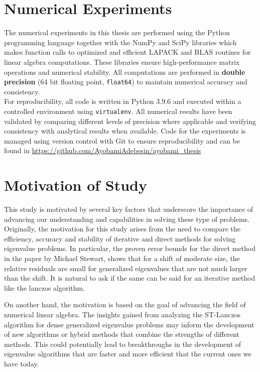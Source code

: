 \documentclass[12pt,gsu,online,openany,singleside,hidelinks]{gsudiss}
\newcommand{\comm}[1]{\added[comment={#1}]{}}
\begin{document}
\section{Numerical Experiments}

\comm{This material would be better if it were at the beginning of the section where you give results of experiments.}
The numerical experiments in this thesis are performed using the Python programming language together with the NumPy and SciPy libraries which makes function calls to optimized and efficient LAPACK and BLAS routines for linear algebra computations. These libraries ensure high-performance matrix operations and numerical stability. All computations are performed in \textbf{double precision} (64 bit floating point, \texttt{float64}) to maintain numerical accuracy and consistency.\\
For reproducibility, all code is written in Python $3.9.6$ and executed within a controlled environment using \texttt{virtualenv}. All numerical results have been validated by comparing different levels of precision where applicable and verifying consistency with analytical results when available. Code for the experiments is managed using version control with Git to ensure reproducibility and can be found in \href{https://github.com/AyobamiAdebesin/ayobami_thesis}{https://github.com/AyobamiAdebesin/ayobami\_thesis}
\section{Motivation of Study}
This study is motivated by several key factors that underscore the importance of advancing our understanding and capabilities in solving these type of problems. Originally, the motivation for this study arises from the need to compare the efficiency, accuracy and stability of iterative and direct methods for solving eigenvalue problems. In particular, the proven error bounds for the direct method in the paper by Michael Stewart, shows that for a shift of moderate size, the relative residuals are small for generalized eigenvalues that are not much larger than the shift. It is natural to ask if the same can be said for an iterative method like the lanczos algorithm.\par
On another hand, the motivation is based on the goal of advancing the field of numerical linear algebra. The insights gained from analyzing the ST-Lanczos algorithm for dense generalized eigenvalue problems may inform the development of new algorithms or hybrid methods that combine the strengths of different methods. This could potentially lead to breakthroughs in the development of eigenvalue algorithms that are faster and more efficient that the current ones we have today.\\
\end{document}
